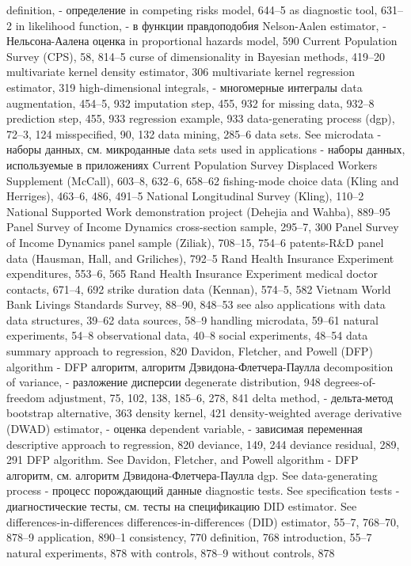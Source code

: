 definition, - определение
in competing risks model, 644–5
as diagnostic tool, 631–2
in likelihood function, - в функции правдоподобия
Nelson-Aalen estimator, - Нельсона-Аалена оценка 
in proportional hazards model, 590
Current Population Survey (CPS), 58, 814–5 curse of dimensionality
in Bayesian methods, 419–20
multivariate kernel density estimator, 306 multivariate kernel regression estimator, 319 
high-dimensional integrals, - многомерные интегралы
data augmentation, 454–5, 932 imputation step, 455, 932 for missing data, 932–8 prediction step, 455, 933 regression example, 933
data-generating process (dgp), 72–3, 124 misspecified, 90, 132
data mining, 285–6
data sets. See microdata - наборы данных, см. микроданные
data sets used in applications - наборы данных, используемые в приложениях
Current Population Survey Displaced Workers Supplement (McCall), 603–8, 632–6, 658–62
fishing-mode choice data (Kling and Herriges), 463–6, 486, 491–5
National Longitudinal Survey (Kling), 110–2 National Supported Work demonstration project
(Dehejia and Wahba), 889–95
Panel Survey of Income Dynamics cross-section
sample, 295–7, 300
Panel Survey of Income Dynamics panel sample
(Ziliak), 708–15, 754–6
patents-R&D panel data (Hausman, Hall, and
Griliches), 792–5
Rand Health Insurance Experiment expenditures,
553–6, 565
Rand Health Insurance Experiment medical doctor
contacts, 671–4, 692
strike duration data (Kennan), 574–5, 582 Vietnam World Bank Livings Standards Survey,
88–90, 848–53
see also applications with data
data structures, 39–62
data sources, 58–9 handling microdata, 59–61 natural experiments, 54–8 observational data, 40–8 social experiments, 48–54
data summary approach to regression, 820
Davidon, Fletcher, and Powell (DFP) algorithm - DFP алгоритм, алгоритм Дэвидона-Флетчера-Паулла
decomposition of variance, - разложение дисперсии
degenerate distribution, 948
degrees-of-freedom adjustment, 75, 102, 138, 185–6,
278, 841
delta method, - дельта-метод
bootstrap alternative, 363
density kernel, 421
density-weighted average derivative (DWAD)
estimator, - оценка
dependent variable, - зависимая переменная
descriptive approach to regression, 820
deviance, 149, 244
deviance residual, 289, 291
DFP algorithm. See Davidon, Fletcher, and Powell
algorithm - DFP алгоритм, см. алгоритм Дэвидона-Флетчера-Паулла
dgp. See data-generating process - процесс порождающий данные
diagnostic tests. See specification tests - диагностические тесты, см. тесты на спецификацию
DID estimator. See differences-in-differences differences-in-differences (DID) estimator, 55–7,
768–70, 878–9 application, 890–1 consistency, 770 definition, 768 introduction, 55–7 natural experiments, 878 with controls, 878–9 without controls, 878
